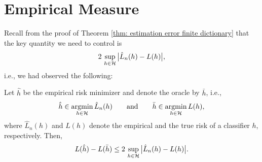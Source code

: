 \section{Empirical Measure}

Recall from the proof of Theorem \ref{thm: estimation error finite dictionary} that the key quantity we need to control is
\[
    2 \, \sup_{h \in \mathcal{H}} \big\lvert \hat L_n(h) - L(h) \big\rvert,
\]
i.e., we had observed the following:

\begin{lemma}
\label{lem: bound on estimation error}
Let $\hat h$ be the empirical risk minimizer and denote the oracle by $\bar h$, i.e.,
\[
    \hat h \in \operatorname*{argmin}_{h \in \mathcal{H}} \hat L_n(h) \qquad \text{and} \qquad \bar h \in \operatorname*{argmin}_{h \in \mathcal{H}} L(h),
\]
where $\hat L_n(h)$ and $L(h)$ denote the empirical and the true risk of a classifier $h$, respectively. Then,
\[
    L(\hat h) - L(\bar h) \leq 2 \, \sup_{h \in \mathcal{H}} \big\lvert \hat L_n(h) - L(h) \big\rvert.
\]
\end{lemma}

